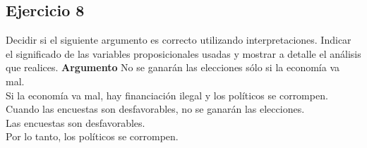 \documentclass[a4paper]{article}
\begin{document}
\subsection*{Ejercicio 8}
Decidir si el siguiente argumento es correcto utilizando interpretaciones. Indicar el significado 
de las variables proposicionales usadas y mostrar a detalle el análisis que realices.
\newline 
\textbf{Argumento}
\newline
No se ganar\'an las elecciones s\'olo si la econom\'ia va mal. \\
Si la econom\'ia va mal, hay financiaci\'on ilegal y los pol\'iticos se 
corrompen.\\
Cuando las encuestas son desfavorables, no se ganar\'an las elecciones.\\
Las encuestas son desfavorables.\\
Por lo tanto, los pol\'iticos se corrompen.
\end{document}
